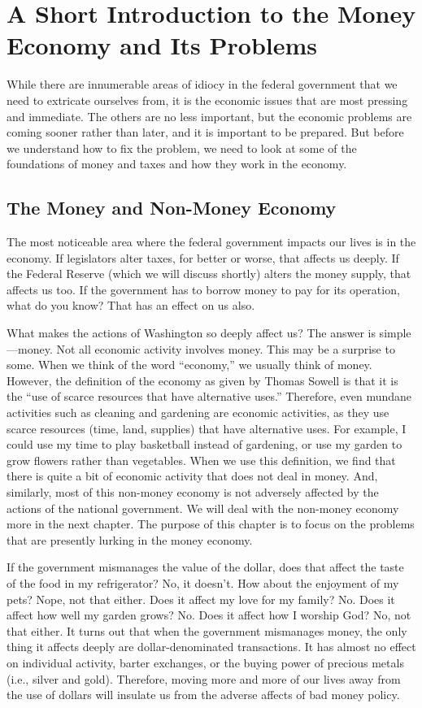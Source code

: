 
\chapter{A Short Introduction to the Money Economy and Its Problems}


While there are innumerable areas of idiocy in the federal government
that we need to extricate ourselves from, it is the economic issues
that are most pressing
and immediate. The
others are no less important, but the economic problems are coming
sooner rather than later, and it is important to be prepared.  But
before we understand how to fix the problem, we need to look at some of
the foundations of money and taxes and how they work in the economy.

\section{The Money and Non-Money Economy}

The most noticeable area where the federal government impacts our lives
is in the economy. If legislators alter taxes, for better or worse,
that affects us deeply. If the Federal Reserve (which we will discuss
shortly) alters the money supply, that affects us too. If the
government has to borrow money to pay for its operation,
what do you know? That
has an effect on us also.


What makes the actions of Washington so deeply affect us?  The answer is
simple—money.  Not all economic activity involves money. This may be a
surprise to some. When we think of the word “economy,” we usually think
of money. However, the definition of the economy as given by Thomas
Sowell is that it is the “use of scarce resources that have alternative
uses.”  Therefore, even mundane activities such as cleaning and
gardening are economic
activities, as they
use scarce resources (time, land, supplies) that have alternative uses.
For example, I could
use my time to play basketball instead of gardening, or use my garden
to grow flowers rather than vegetables. When we use this definition, we
find that there is quite a bit of economic activity that does not deal
in money. And, similarly, most of this non-money economy is not
adversely affected by the actions of the national government. We will
deal with the non-money economy more in the next chapter. The purpose
of this chapter is to focus on the problems that are presently lurking
in the money economy.


If the government mismanages the value of the dollar, does that affect
the taste of the food in my refrigerator?  No, it doesn’t. How about
the enjoyment of my pets?  Nope, not that either. Does it affect my
love for my family?  No. Does it affect how well my garden grows?  No.
Does it affect how I worship God? No, not that either. It turns out
that when the government mismanages money, the only thing it affects
deeply are dollar-denominated transactions. It has almost no effect on
individual activity, barter exchanges, or the buying power of precious
metals (i.e., silver and gold). Therefore, moving more and more of our
lives away from the use of dollars will insulate us from the adverse
affects of bad money policy.

